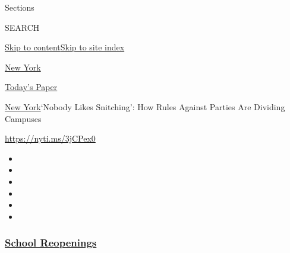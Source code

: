 Sections

SEARCH

\protect\hyperlink{site-content}{Skip to
content}\protect\hyperlink{site-index}{Skip to site index}

\href{https://www.nytimes3xbfgragh.onion/section/nyregion}{New York}

\href{https://myaccount.nytimes3xbfgragh.onion/auth/login?response_type=cookie\&client_id=vi}{}

\href{https://www.nytimes3xbfgragh.onion/section/todayspaper}{Today's
Paper}

\href{/section/nyregion}{New York}\textbar{}`Nobody Likes Snitching':
How Rules Against Parties Are Dividing Campuses

\url{https://nyti.ms/3jCPex0}

\begin{itemize}
\item
\item
\item
\item
\item
\item
\end{itemize}

\hypertarget{school-reopenings}{%
\subsubsection{\texorpdfstring{\href{https://www.nytimes3xbfgragh.onion/spotlight/schools-reopening?name=styln-coronavirus-schools-reopening\&region=TOP_BANNER\&block=storyline_menu_recirc\&action=click\&pgtype=Article\&impression_id=3bd86cc0-f27b-11ea-9a21-295489aede86\&variant=undefined}{School
Reopenings}}{School Reopenings}}\label{school-reopenings}}

